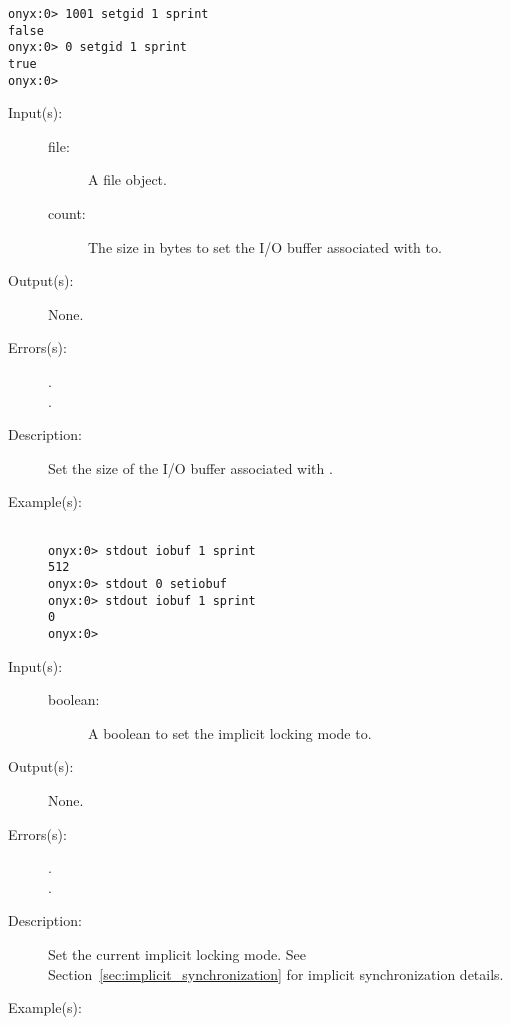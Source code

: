 \begin{description}
\begin{description}
\begin{verbatim}
onyx:0> 1001 setgid 1 sprint
false
onyx:0> 0 setgid 1 sprint
true
onyx:0>
		\end{verbatim}
	\end{description}
\label{systemdict:setiobuf}
\item[{\onyxop{file count}{setiobuf}{--}}: ]
	\begin{description}\item[]
	\item[Input(s): ]
		\begin{description}\item[]
		\item[file: ]
			A file object.
		\item[count: ]
			The size in bytes to set the I/O buffer associated with
			 to.
		\end{description}
	\item[Output(s): ] None.
	\item[Errors(s): ]
		\begin{description}\item[]
		\item[.]
		\item[.]
		\end{description}
	\item[Description: ]
		Set the size of the I/O buffer associated with .
	\item[Example(s): ]\begin{verbatim}

onyx:0> stdout iobuf 1 sprint
512
onyx:0> stdout 0 setiobuf
onyx:0> stdout iobuf 1 sprint
0
onyx:0>
		\end{verbatim}
	\end{description}
\label{systemdict:setlocking}
\item[{\onyxop{boolean}{setlocking}{--}}: ]
	\begin{description}\item[]
	\item[Input(s): ]
		\begin{description}\item[]
		\item[boolean: ]
			A boolean to set the implicit locking mode to.
		\end{description}
	\item[Output(s): ] None.
	\item[Errors(s): ]
		\begin{description}\item[]
		\item[.]
		\item[.]
		\end{description}
	\item[Description: ]
		Set the current implicit locking mode.  See
		Section~\ref{sec:implicit_synchronization} for implicit
		synchronization details.
	\item[Example(s): ]\begin{verbatim}


\end{verbatim}
\end{description}
\end{description}
